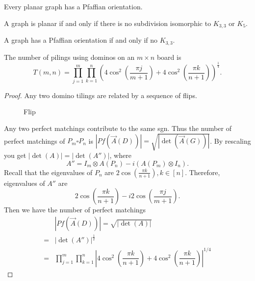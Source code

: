 \begin{theorem}
Every planar graph has a Pfaffian orientation.
\end{theorem}
\begin{theorem}
A graph is planar if and only if there is no subdivision isomorphic to $K_{3,3}$ or $K_5$.
\end{theorem}
\begin{theorem}
A graph has a Pfaffian orientation if and only if no $K_{3,3}$.
\end{theorem}
\begin{theorem}
The number of pilings using dominos on an $m\times n$ board is 
$$T(m,n)=\prod_{j=1}^{m}\prod_{k=1}^n(4\cos^2(\frac{\pi j}{m+1})+4\cos^2(\frac{\pi k}{n+1}))^{\frac{1}{4}}.$$
\end{theorem}
\begin{proof}
Any two domino tilings are related by a sequence of flips.
\begin{figure}[ht!]
\centering
{}
\label{fig:domino_flip}
\caption{Flip}
\end{figure}
Any two perfect matchings contribute to the same sgn. Thus the number of perfect matchings of $P_m\square P_n$ is $|Pf(\vec{A}(D))|=\sqrt{|\det(\vec{A}(G))|}$. By rescaling you get $|\det(A)|=|\det(A'')|$, where 
$$A''=I_m\otimes A(P_n)-i(A(P_m)\otimes I_n).$$
Recall that the eigenvalues of $P_n$ are $2\cos(\frac{\pi k}{n+1}),k\in[n]$. Therefore, eigenvalues of $A''$ are 
$$2\cos(\frac{\pi k}{n+1})-i2\cos(\frac{\pi j}{m+1}).$$
Then we have the number of perfect matchings 
\begin{align*}
&|Pf(\vec{A}(D))|=\sqrt{|\det(A)|}\\
=&|\det(A'')|^{\frac{1}{2}}\\
=&\prod_{j=1}^{m}\prod_{k=1}^n |4\cos^2(\dfrac{\pi k}{n+1}) +4\cos^2(\dfrac{\pi k}{n+1})|^{1/4}
\end{align*}


\end{proof}

